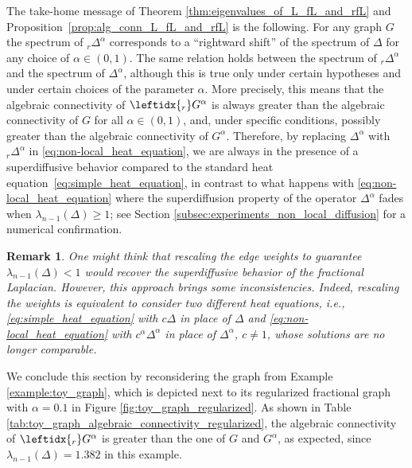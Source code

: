 \documentclass[a4paper,12pt]{article}
\newtheorem{remark}{Remark}
\newcommand{\fL}{\Delta^\alpha}
\newcommand{\rfL}{{}_r\fL}
\newcommand{\fG}{G^\alpha}
\newcommand{\rfG}{\leftidx{_r}\fG}
\begin{document}
The take-home message of Theorem \ref{thm:eigenvalues_of_L_fL_and_rfL} and Proposition~\ref{prop:alg_conn_L_fL_and_rfL} is the following. For any graph $G$ the spectrum of $\rfL$ corresponds to a ``rightward shift'' of the spectrum of $\Delta$ for any choice of $\alpha\in(0,1)$. The same relation holds between the spectrum of $\rfL$ and the spectrum of $\fL$, although this is true only under certain hypotheses and under certain choices of the parameter $\alpha$. More precisely, this means that the algebraic connectivity of $\rfG$ is always greater than the algebraic connectivity of $G$ for all $\alpha\in(0,1)$, and, under specific conditions, possibly greater than the algebraic connectivity of $\fG$. Therefore, by replacing $\fL$ with $\rfL$ in \eqref{eq:non-local_heat_equation}, we are always in the presence of a superdiffusive behavior compared to the standard heat equation~\eqref{eq:simple_heat_equation}, in contrast to what happens with \eqref{eq:non-local_heat_equation} where the superdiffusion property of the operator $\fL$ fades when $\lambda_{n-1}(\Delta)\geq1$; see Section \ref{subsec:experiments_non_local_diffusion} for a numerical confirmation. 

\begin{remark}
One might think that rescaling the edge weights to guarantee $\lambda_{n-1}(\Delta)<1$ would recover the superdiffusive behavior of the fractional Laplacian. However, this approach brings some inconsistencies. Indeed, rescaling the weights is equivalent to consider two different heat equations, i.e., \eqref{eq:simple_heat_equation} with $c\Delta$ in place of $\Delta$ and \eqref{eq:non-local_heat_equation} with $c^\alpha\fL$ in place of $\fL$, $c\neq1$, whose solutions are no longer comparable.
\end{remark}

We conclude this section by reconsidering the graph from Example \ref{example:toy_graph}, which is depicted next to its regularized fractional graph with $\alpha=0.1$ in Figure \ref{fig:toy_graph_regularized}. As shown in Table \ref{tab:toy_graph_algebraic_connectivity_regularized}, the algebraic connectivity of $\rfG$ is greater than the one of $G$ and $\fG$, as expected, since $\lambda_{n-1}(\Delta)=1.382$ in this example. 
\end{document}

